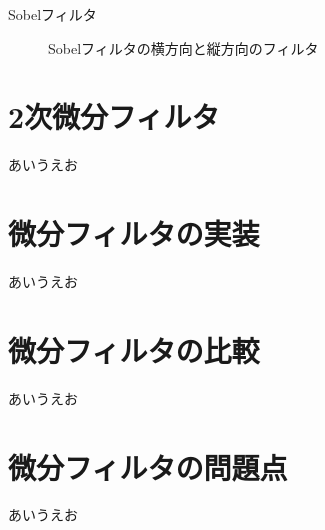 \documentclass[10pt, jfont=ipaexm]{beamer} %
\begin{document}
\begin{frame}{Sobelフィルタ}
        \begin{block}{}
        \begin{figure}[H]
            \qquad
            \caption{Sobelフィルタの横方向と縦方向のフィルタ}
            \label{fig:prewitt_filter}
        \end{figure}
    \end{block}
\end{frame}
\section{2次微分フィルタ}
\begin{frame}
    あいうえお
\end{frame}
\section{微分フィルタの実装}
\begin{frame}
    あいうえお
\end{frame}
\section{微分フィルタの比較}
\begin{frame}
    あいうえお
\end{frame}
\section{微分フィルタの問題点}
\begin{frame}
    あいうえお
\end{frame}
\end{document}
